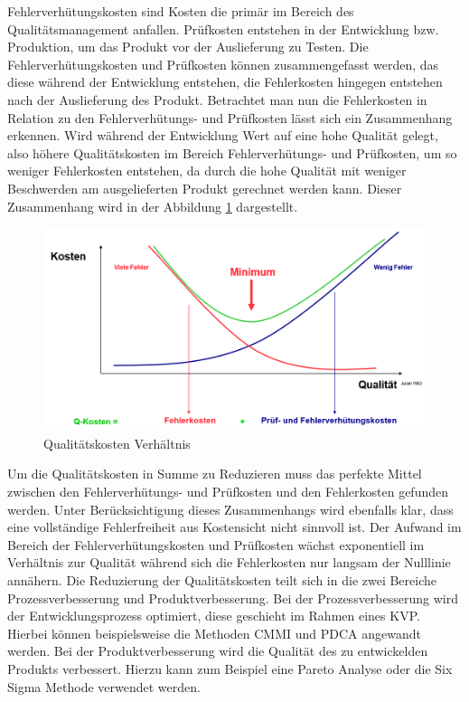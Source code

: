 Fehlerverhütungskosten sind Kosten die primär im Bereich des Qualitätsmanagement anfallen.
Prüfkosten entstehen in der Entwicklung bzw. Produktion, um das Produkt vor der Auslieferung zu Testen.
Die Fehlerverhütungskosten und Prüfkosten können zusammengefasst werden, das diese während der Entwicklung entstehen, die Fehlerkosten hingegen entstehen nach der Auslieferung des Produkt.
\newparagraph
Betrachtet man nun die Fehlerkosten in Relation zu den Fehlerverhütungs- und Prüfkosten lässt sich ein Zusammenhang erkennen.
Wird während der Entwicklung Wert auf eine hohe Qualität gelegt, also höhere Qualitätskosten im Bereich Fehlerverhütungs- und Prüfkosten, um so weniger Fehlerkosten entstehen, da durch die hohe Qualität mit weniger Beschwerden am ausgelieferten Produkt gerechnet werden kann.
Dieser Zusammenhang wird in der Abbildung \ref{fig:QKostenVerhaeltnis} dargestellt.
\begin{figure}[H]
    \centering
    \includegraphics[width=1\textwidth]{images/qkostenverhaeltnis.png}
    \caption{Qualitätskosten Verhältnis}
    \label{fig:QKostenVerhaeltnis}
\end{figure}\noindent
Um die Qualitätskosten in Summe zu Reduzieren muss das perfekte Mittel zwischen den Fehlerverhütungs- und Prüfkosten und den Fehlerkosten gefunden werden.
Unter Berücksichtigung dieses Zusammenhangs wird ebenfalls klar, dass eine vollständige Fehlerfreiheit aus Kostensicht nicht sinnvoll ist.
Der Aufwand im Bereich der Fehlerverhütungskosten und Prüfkosten wächst exponentiell im Verhältnis zur Qualität während sich die Fehlerkosten nur langsam der Nulllinie annähern.
\newparagraph
Die Reduzierung der Qualitätskosten teilt sich in die zwei Bereiche Prozessverbesserung und Produktverbesserung.
Bei der Prozessverbesserung wird der Entwicklungsprozess optimiert, diese geschieht im Rahmen eines \ac{KVP}. 
Hierbei können beispielsweise die Methoden CMMI und PDCA angewandt werden.
Bei der Produktverbesserung wird die Qualität des zu entwickelden Produkts verbessert.
Hierzu kann zum Beispiel eine Pareto Analyse oder die Six Sigma Methode verwendet werden.

